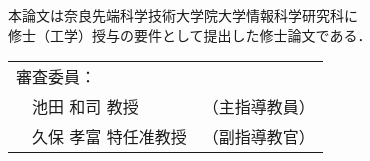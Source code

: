 \renewcommand\thepage{Title2}
\thispagestyle{empty}
\vspace*{8cm}
\begin{center}
本論文は奈良先端科学技術大学院大学情報科学研究科に$\ $ \\
修士（工学）授与の要件として提出した修士論文である．

 \bigskip

 \jauthor
 \vspace*{0.4cm}
 \begin{table}[h]
 \begin{center}
	\begin{tabular}[t]{p{}ll}
	 \multicolumn{2}{l}{審査委員：} \\
	 & 池田 和司 教授 & （主指導教員） \\
	 & 久保 孝富 特任准教授 & （副指導教官）
	\end{tabular}
 \end{center}
 \end{table}
 \end{center}
